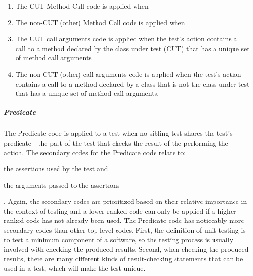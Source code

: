 \begin{enumerate}
\item The CUT Method Call code is applied when 

\item The non-CUT (other) Method Call code is applied when 

\item The CUT call arguments code is applied when the test’s action contains a call to a method declared by the class under test (CUT) that has a unique set of method call arguments

\item The non-CUT (other) call arguments code is applied when the test’s action contains a call to a method declared by a class that is not the class under test that has a unique set of method call arguments.
\end{enumerate}

\subparagraph{Predicate}

The Predicate code is applied to a test when no sibling test shares the test’s predicate---the part of the test that checks the result of the performing the action.
%
The secondary codes for the Predicate code relate to: 
\begin{enumerate*}
\item the assertions used by the test and 
\item the arguments passed to the assertions
\end{enumerate*}.
%
Again, the secondary codes are prioritized based on their relative importance in the context of testing and a lower-ranked code can only be applied if a higher-ranked code has not already been used.
%
The Predicate code has noticeably more secondary codes than other top-level codes.
%
First, the definition of unit testing is to test a minimum component of a software, so the testing process is usually involved with checking the produced results.
%
Second, when checking the produced results, there are many different kinds of result-checking statements that can be used in a test, which will make the test unique.

